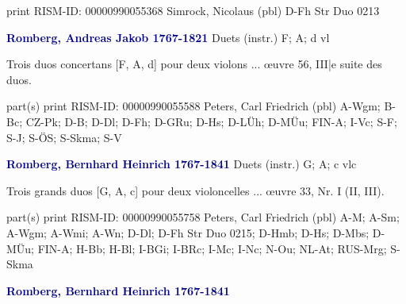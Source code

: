 \documentclass[twocolumn]{book}
\begin{document}
\newline print
\newline RISM-ID: 00000990055368
\newline Simrock, Nicolaus  (pbl)
\newline D-Fh  Str Duo 0213
\newline \par \vspace{7pt} \textcolor{darkblue}{\textbf{Romberg, Andreas Jakob  1767-1821}}
\newline Duets (instr.)  F; A; d  
 vl
\newline \begin{itshape}Trois duos concertans [F, A, d] pour deux violons ... œuvre 56, III|e suite des duos.\end{itshape} 
\newline \textcolor{darkblue}{}  part(s)  
\newline print
\newline RISM-ID: 00000990055588
\newline Peters, Carl Friedrich  (pbl)
\newline A-Wgm; B-Bc; CZ-Pk; D-B; D-Dl; D-Fh; D-GRu; D-Hs; D-LÜh; D-MÜu; FIN-A; I-Vc; S-F; S-J; S-ÖS; S-Skma; S-V
\newline \par \vspace{7pt} \textcolor{darkblue}{\textbf{Romberg, Bernhard Heinrich  1767-1841}}
\newline Duets (instr.)  G; A; c  
 vlc
\newline \begin{itshape}Trois grands duos [G, A, c] pour deux violoncelles ... œuvre 33, Nr. I (II, III).\end{itshape} 
\newline \textcolor{darkblue}{}  part(s)  
\newline print
\newline RISM-ID: 00000990055758
\newline Peters, Carl Friedrich  (pbl)
\newline A-M; A-Sm; A-Wgm; A-Wmi; A-Wn; D-Dl; D-Fh  Str Duo 0215; D-Hmb; D-Hs; D-Mbs; D-MÜu; FIN-A; H-Bb; H-Bl; I-BGi; I-BRc; I-Mc; I-Nc; N-Ou; NL-At; RUS-Mrg; S-Skma
\newline \par \vspace{7pt} \textcolor{darkblue}{\textbf{Romberg, Bernhard Heinrich  1767-1841}}
\end{document}
